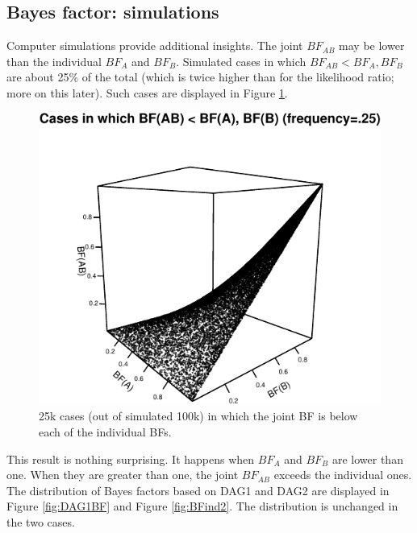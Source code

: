 \documentclass[
  10pt,
  dvipsnames,enabledeprecatedfontcommands]{scrartcl}
\begin{document}
\hypertarget{bayes-factor-simulations}{%
\subsection*{Bayes factor: simulations}\label{bayes-factor-simulations}}

Computer simulations provide additional insights. The joint \(BF_{AB}\)
may be lower than the individual \(BF_A\) and \(BF_B\). Simulated cases
in which \(BF_{AB} < BF_{A}, BF_{B}\) are about 25\% of the total (which
is twice higher than for the likelihood ratio; more on this later). Such
cases are displayed in Figure \ref{fig:BFfails}.

\vspace{1mm}
\footnotesize

\normalsize

\vspace{1mm}
\footnotesize

\normalsize

\begin{figure}

\begin{center}\includegraphics[width=0.7\linewidth]{conjunction-appendix14_files/figure-latex/unnamed-chunk-15-1} \end{center}
\caption{25k cases (out of simulated 100k) in which the joint BF is below each of the individual BFs.}
\label{fig:BFfails}
\end{figure}

This result is nothing surprising. It happens when \(BF_A\) and \(BF_B\)
are lower than one. When they are greater than one, the joint
\(BF_{AB}\) exceeds the individual ones. The distribution of Bayes
factors based on \textsf{DAG1} and \textsf{DAG2} are displayed in Figure
\ref{fig:DAG1BF} and Figure \ref{fig:BFind2}. The distribution is
unchanged in the two cases.
\end{document}
